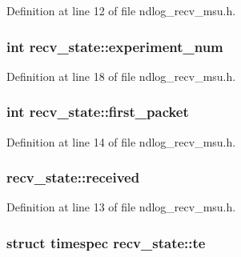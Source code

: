 Definition at line 12 of file ndlog\-\_\-recv\-\_\-msu.\-h.

\hypertarget{structrecv__state_a914b921476b9dce11a70996b5282d2f8}{
\subsubsection[{experiment\-\_\-num}]{\setlength{\rightskip}{0pt plus 5cm}int recv\-\_\-state\-::experiment\-\_\-num}}\label{structrecv__state_a914b921476b9dce11a70996b5282d2f8}


Definition at line 18 of file ndlog\-\_\-recv\-\_\-msu.\-h.

\hypertarget{structrecv__state_aaa4978ceb10d1540c7555bdbf1cd4d45}{
\subsubsection[{first\-\_\-packet}]{\setlength{\rightskip}{0pt plus 5cm}int recv\-\_\-state\-::first\-\_\-packet}}\label{structrecv__state_aaa4978ceb10d1540c7555bdbf1cd4d45}


Definition at line 14 of file ndlog\-\_\-recv\-\_\-msu.\-h.

\hypertarget{structrecv__state_ad846f5bdb59047e4064a5d1f84ea7e0a}{
\subsubsection[{received}]{ recv\-\_\-state\-::received}}\label{structrecv__state_ad846f5bdb59047e4064a5d1f84ea7e0a}


Definition at line 13 of file ndlog\-\_\-recv\-\_\-msu.\-h.

\hypertarget{structrecv__state_a88a57436666fe47d8f22261ec811ea16}{
\subsubsection[{te}]{\setlength{\rightskip}{0pt plus 5cm}struct timespec recv\-\_\-state\-::te}}\label{structrecv__state_a88a57436666fe47d8f22261ec811ea16}


